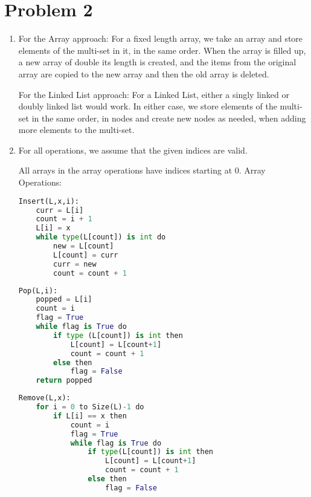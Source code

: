 \documentclass{article}
\begin{document}
\section{Problem 2}
\begin{enumerate}[label=(\alph*)]
    \item For the Array approach: For a fixed length array, we take an array and store elements of the multi-set in it, in the same order. When the array is filled up, a new array of double its length is created, and the items from the original array are copied to the new array and then the old array is deleted.
    
        For the Linked List approach: For a Linked List, either a singly linked or doubly linked list would work. In either case, we store elements of the multi-set in the same order, in nodes and create new nodes as needed, when adding more elements to the multi-set.
    
    \item For all operations, we assume that the given indices are valid.  
    
    All arrays in the array operations have indices starting at 0. 
    \newline Array Operations:
    

\begin{lstlisting}[language=Python]
Insert(L,x,i):
    curr = L[i]
    count = i + 1
    L[i] = x
    while type(L[count]) is int do
        new = L[count]
        L[count] = curr
        curr = new
        count = count + 1
\end{lstlisting}

\begin{lstlisting}[language=Python]
Pop(L,i):
    popped = L[i]
    count = i
    flag = True
    while flag is True do
        if type (L[count]) is int then
            L[count] = L[count+1]
            count = count + 1
        else then
            flag = False
    return popped
\end{lstlisting}

\begin{lstlisting}[language=Python]
Remove(L,x):
    for i = 0 to Size(L)-1 do
        if L[i] == x then
            count = i
            flag = True
            while flag is True do
                if type(L[count]) is int then
                    L[count] = L[count+1]
                    count = count + 1
                else then
                    flag = False
\end{lstlisting}


\end{enumerate}
\end{document}
